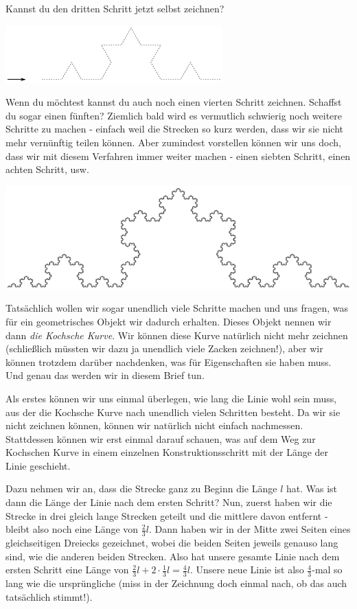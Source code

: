 \documentclass[a4paper,ngerman,12pt]{scrartcl}
\theoremstyle{definition}
\theoremstyle{plain}
\theoremstyle{remark}
\begin{document}
Kannst du den dritten Schritt jetzt selbst zeichnen?

\begin{center}
	\includegraphics[width=.7\textwidth]{Bilder/Schneeflocke-Konstruktion2.pdf}
\end{center}

Wenn du möchtest kannst du auch noch einen vierten Schritt zeichnen. Schaffst du sogar einen fünften? Ziemlich bald wird es vermutlich schwierig noch weitere Schritte zu machen - einfach weil die Strecken so kurz werden, dass wir sie nicht mehr vernünftig teilen können. Aber zumindest vorstellen können wir uns doch, dass wir mit diesem Verfahren immer weiter machen - einen siebten Schritt, einen achten Schritt, usw. 

\begin{center}
	\includegraphics[width=.5\textwidth]{Bilder/Schneeflocke-Konstruktion3.pdf}
\end{center}

Tatsächlich wollen wir sogar \glqq unendlich viele\grqq{} Schritte machen und uns fragen, was für ein geometrisches Objekt wir dadurch erhalten. Dieses Objekt nennen wir dann \emph{die Kochsche Kurve}. Wir können diese Kurve natürlich nicht mehr zeichnen (schließlich müssten wir dazu ja unendlich viele Zacken zeichnen!), aber wir können trotzdem darüber nachdenken, was für Eigenschaften sie haben muss. Und genau das werden wir in diesem Brief tun. 

Als erstes können wir uns einmal überlegen, wie lang die Linie wohl sein muss, aus der die Kochsche Kurve \glqq nach unendlich vielen Schritten\grqq{} besteht. Da wir sie nicht zeichnen können, können wir natürlich nicht einfach nachmessen. Stattdessen können wir erst einmal darauf schauen, was auf dem Weg zur Kochschen Kurve in einem einzelnen Konstruktionsschritt mit der Länge der Linie geschieht.

Dazu nehmen wir an, dass die Strecke ganz zu Beginn die Länge $l$ hat. Was ist dann die Länge der Linie nach dem ersten Schritt? Nun, zuerst haben wir die Strecke in drei gleich lange Strecken geteilt und die mittlere davon entfernt - bleibt also noch eine Länge von $\frac{2}{3}l$. Dann haben wir in der Mitte zwei Seiten eines gleichseitigen Dreiecks gezeichnet, wobei die beiden Seiten jeweils genauso lang sind, wie die anderen beiden Strecken. Also hat unsere gesamte Linie nach dem ersten Schritt eine Länge von $\frac{2}{3}l + 2\cdot\frac{1}{3}l = \frac{4}{3}l$. Unsere neue Linie ist also $\frac{4}{3}$-mal so lang wie die ursprüngliche (miss in der Zeichnung doch einmal nach, ob das auch tatsächlich stimmt!).
\end{document}
